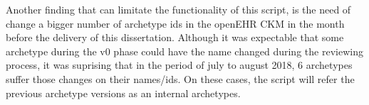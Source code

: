 \documentclass[mim_thesis.tex]{subfiles}
\begin{document}
Another finding that can limitate the functionality of this script, is the need of change a bigger number of archetype ids in the openEHR CKM in the month before the delivery of this dissertation. Although it was expectable that some archetype during the v0 phase could have the name changed during the reviewing process, it was suprising that in the period of july to august 2018, 6 archetypes suffer those changes on their names/ids. On these cases, the script will refer the previous archetype versions as an internal archetypes. 
\end{document}
